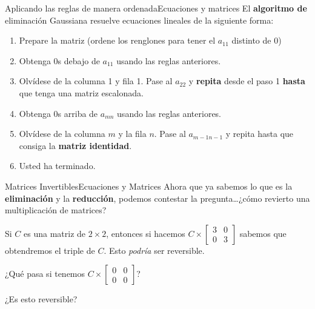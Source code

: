 \documentclass[spanish, c]{beamer}
\begin{document}
\begin{frame}{Aplicando las reglas de manera ordenada}{Ecuaciones y matrices}
    El \textbf{algoritmo de} \alert{eliminación Gaussiana} resuelve ecuaciones lineales de la siguiente forma:

    \begin{enumerate}
        \item Prepare la matriz (ordene los  renglones para tener el $a_{11}$ distinto de 0)
        \item Obtenga 0s debajo de $a_{11}$ usando las reglas anteriores.
        \item Olvídese de la columna 1 y fila 1. Pase al $a_{22}$ y \textbf{repita} desde el paso 1 \textbf{hasta} que tenga una \alert{matriz escalonada}.
        \item Obtenga 0s arriba de $a_{mn}$ usando las reglas anteriores.
        \item Olvídese de la columna $m$ y la fila $n$. Pase al $a_{m-1n-1}$ y repita hasta que consiga la \textbf{matriz identidad}.
        \item Usted ha terminado.
    \end{enumerate}

\end{frame}

\begin{frame}{Matrices Invertibles}{Ecuaciones y Matrices}
    Ahora que ya sabemos lo que es la \textbf{eliminación} y la \textbf{reducción}, podemos contestar la pregunta\dots ¿cómo revierto una multiplicación de matrices? \pause

    \bigskip

    Si $C$ es una matriz de $2 \times  2$, entonces si hacemos $C \times \begin{bmatrix*}
        3 & 0 \\ 0 & 3
    \end{bmatrix*}$ sabemos que obtendremos el triple de $C$. Esto \textit{podría} ser reversible. \pause

    \bigskip

    ¿Qué pasa si tenemos $C \times \begin{bmatrix*}
        0 & 0 \\ 0 & 0
    \end{bmatrix*}$? \pause

    \bigskip

    ¿Es esto reversible?

\end{frame}
\end{document}
